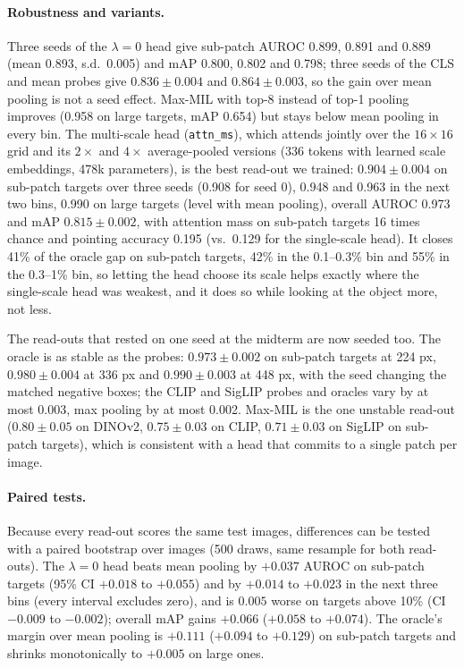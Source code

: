 \documentclass[10pt,letterpaper,twocolumn]{article}
\begin{document}
\paragraph{Robustness and variants.}
Three seeds of the $\lambda=0$ head give sub-patch AUROC 0.899, 0.891 and 0.889 (mean 0.893, s.d.\ 0.005) and mAP 0.800, 0.802 and 0.798; three seeds of the CLS and mean probes give $0.836\pm0.004$ and $0.864\pm0.003$, so the gain over mean pooling is not a seed effect. Max-MIL with top-8 instead of top-1 pooling improves (0.958 on large targets, mAP 0.654) but stays below mean pooling in every bin. The multi-scale head
(\texttt{attn\_ms}), which attends jointly over the $16\times16$ grid and its $2\times$ and
$4\times$ average-pooled versions (336 tokens with learned scale embeddings, 478k parameters),
is the best read-out we trained: $0.904\pm0.004$ on sub-patch targets over three seeds (0.908 for seed 0), 0.948 and 0.963 in the next two bins, 0.990 on large targets (level with mean pooling), overall AUROC 0.973 and mAP $0.815\pm0.002$, with
attention mass on sub-patch targets 16 times chance and pointing accuracy 0.195 (vs.\ 0.129
for the single-scale head). It closes 41\% of the oracle gap on sub-patch targets, 42\% in the
0.1--0.3\% bin and 55\% in the 0.3--1\% bin, so letting the head choose its scale helps exactly
where the single-scale head was weakest, and it does so while looking at the object more, not
less.

The read-outs that rested on one seed at the midterm are now seeded too. The oracle is as stable as the probes: $0.973\pm0.002$ on sub-patch targets at 224 px, $0.980\pm0.004$ at 336 px and $0.990\pm0.003$ at 448 px, with the seed changing the matched negative boxes; the CLIP and SigLIP probes and oracles vary by at most 0.003, max pooling by at most 0.002. Max-MIL is the one unstable read-out ($0.80\pm0.05$ on DINOv2, $0.75\pm0.03$ on CLIP, $0.71\pm0.03$ on SigLIP on sub-patch targets), which is consistent with a head that commits to a single patch per image.

\paragraph{Paired tests.}
Because every read-out scores the same test images, differences can be tested with a paired
bootstrap over images (500 draws, same resample for both read-outs). The $\lambda=0$ head beats
mean pooling by $+0.037$ AUROC on sub-patch targets (95\% CI $+0.018$ to $+0.055$) and by
$+0.014$ to $+0.023$ in the next three bins (every interval excludes zero), and is $0.005$
worse on targets above 10\% (CI $-0.009$ to $-0.002$); overall mAP gains $+0.066$ ($+0.058$ to
$+0.074$). The oracle's margin over mean pooling is $+0.111$ ($+0.094$ to $+0.129$) on
sub-patch targets and shrinks monotonically to $+0.005$ on large ones.
\end{document}
